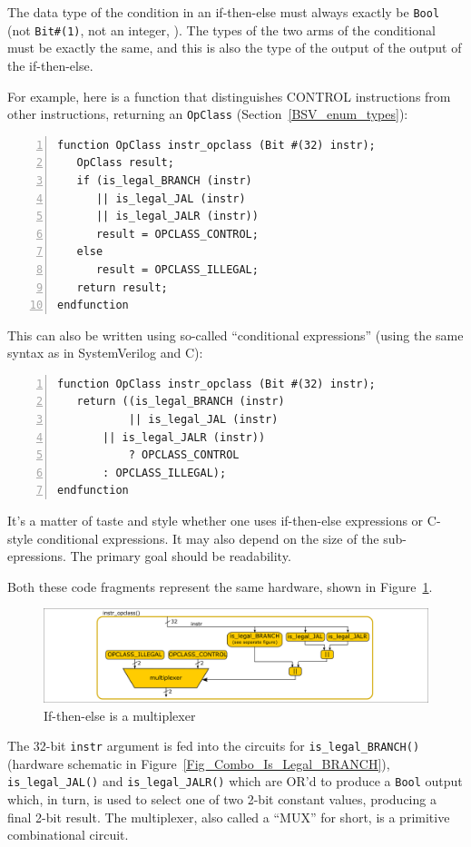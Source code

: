 The data type of the condition in an if-then-else must always exactly
be \verb|Bool| (not \verb|Bit#(1)|, not an integer, {\etc}).  The
types of the two arms of the conditional must be exactly the same, and
this is also the type of the output of the output of the if-then-else.

For example, here is a function that distinguishes CONTROL
instructions from other instructions, returning an \verb|OpClass|
(Section~\ref{BSV_enum_types}):

\begin{Verbatim}[frame=single, numbers=left]
function OpClass instr_opclass (Bit #(32) instr);
   OpClass result;
   if (is_legal_BRANCH (instr)
      || is_legal_JAL (instr)
      || is_legal_JALR (instr))
      result = OPCLASS_CONTROL;
   else
      result = OPCLASS_ILLEGAL;
   return result;
endfunction
\end{Verbatim}

This can also be written using so-called ``conditional expressions''
(using the same syntax as in SystemVerilog and C):

\begin{Verbatim}[frame=single, numbers=left]
function OpClass instr_opclass (Bit #(32) instr);
   return ((is_legal_BRANCH (instr)
           || is_legal_JAL (instr)
	   || is_legal_JALR (instr))
           ? OPCLASS_CONTROL
	   : OPCLASS_ILLEGAL);
endfunction
\end{Verbatim}

It's a matter of taste and style whether one uses if-then-else
expressions or C-style conditional expressions.  It may also depend on
the size of the sub-epressions.  The primary goal should be
readability.

Both these code fragments represent the same hardware, shown in
Figure~\ref{Fig_Combo_Multiplexer}.
\begin{figure}[htbp]
  \centerline{\includegraphics[width=6in,angle=0]{ch040_Combo_Circuits/Figures/Fig_Combo_Multiplexer}}
  \caption{\label{Fig_Combo_Multiplexer}If-then-else is a multiplexer}
\end{figure}
The 32-bit \verb|instr| argument is fed into the circuits for
\verb|is_legal_BRANCH()| (hardware schematic in
Figure~\ref{Fig_Combo_Is_Legal_BRANCH}), \verb|is_legal_JAL()| and
\verb|is_legal_JALR()| which are OR'd to produce a \verb|Bool| output
which, in turn, is used to select one of two 2-bit constant values,
producing a final 2-bit result.  The multiplexer, also called a
``MUX'' for short, is a primitive combinational circuit.

